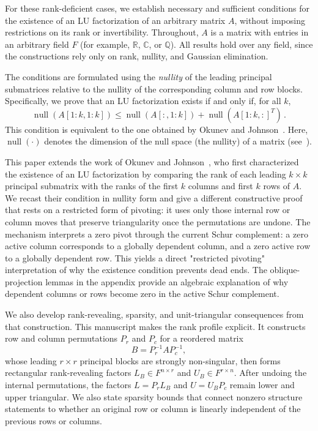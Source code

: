 \documentclass[final]{siamart1116}
\numberwithin{theorem}{section}
\DeclareMathOperator{\nl}{null}
\begin{document}
For these rank-deficient cases, we establish necessary and sufficient conditions for the existence of an LU factorization of an arbitrary matrix $A$, without imposing restrictions on its rank or invertibility. Throughout, $A$ is a matrix with entries in an arbitrary field $F$ (for example, $\mathbb{R}$, $\mathbb{C}$, or $\mathbb{Q}$). All results hold over any field, since the constructions rely only on rank, nullity, and Gaussian elimination.

The conditions are formulated using the \emph{nullity} of the leading principal submatrices relative to the nullity of the corresponding column and row blocks. Specifically, we prove that an LU factorization exists if and only if, for all $k$,
\[
  \nl(A[1:k,1:k]) \le \nl(A[:,1:k]) + \nl({A[1:k,:]}^T) \,.
\]
This condition is equivalent to the one obtained by Okunev and Johnson~\cite{okunev_necessary_2005}. Here, $\nl(\cdot)$ denotes the dimension of the null space (the nullity) of a matrix (see~).

This paper extends the work of Okunev and Johnson~\cite{okunev_necessary_2005}, who first characterized the existence of an LU factorization by comparing the rank of each leading $k \times k$ principal submatrix with the ranks of the first $k$ columns and first $k$ rows of $A$. We recast their condition in nullity form and give a different constructive proof that rests on a restricted form of pivoting: it uses only those internal row or column moves that preserve triangularity once the permutations are undone. The mechanism interprets a zero pivot through the current Schur complement: a zero active column corresponds to a globally dependent column, and a zero active row to a globally dependent row. This yields a direct "restricted pivoting" interpretation of why the existence condition prevents dead ends. The oblique-projection lemmas in the appendix provide an algebraic explanation of why dependent columns or rows become zero in the active Schur complement.

We also develop rank-revealing, sparsity, and unit-triangular consequences from that construction. This manuscript makes the rank profile explicit. It constructs row and column permutations \(P_r\) and \(P_c\) for a reordered matrix
\[
  B=P_r^{-1}AP_c^{-1},
\]
whose leading \(r \times r\) principal blocks are strongly non-singular, then forms rectangular rank-revealing factors \(L_B\in F^{n\times r}\) and \(U_B\in F^{r\times n}\).  After undoing the internal permutations, the factors \(L=P_rL_B\) and \(U=U_BP_c\) remain lower and upper triangular. We also state sparsity bounds that connect nonzero structure statements to whether an original row or column is linearly independent of the previous rows or columns.
\end{document}
